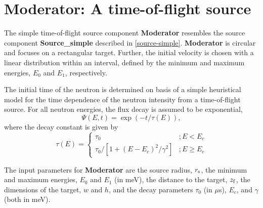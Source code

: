 \section{Moderator: A time-of-flight source}
\label{s:moderator}


The simple time-of-flight source component {\bf Moderator} resembles
the source component {\bf Source\_simple} described in \ref{source-simple}.
{\bf Moderator} is circular and focuses
on a rectangular target. Further, the initial velocity is chosen
with a linear distribution within an interval, defined by the
minimum and maximum energies, $E_0$ and $E_1$, respectively.

The initial time of the neutron is determined on basis of a 
simple heuristical model for the time dependence of the
neutron intensity from a time-of-flight source.
For all neutron energies, the flux decay is assumed to be exponential,
\begin{equation}
\Psi(E,t) = \exp(-t/\tau(E)) ,
\end{equation}
where the decay constant is given by
\begin{equation}
\tau(E) = \left\{
\begin{array}{cc}
 \tau_0                               & ; E<E_c \\
 \tau_0 / [ 1 + (E-E_c)^2/\gamma^2 ]  & ; E \geq E_c
\end{array}
\right.
\end{equation}

The input parameters for {\bf Moderator} are the source radius, $r_{\rm s}$,
the minimum and maximum energies, $E_0$ and $E_1$ (in meV),
the distance to the target, $z_{\rm f}$, the dimensions of the target,
$w$ and $h$, and the decay parameters
$\tau_0$ (in $\mu$s), $E_c$, and $\gamma$ (both in meV).